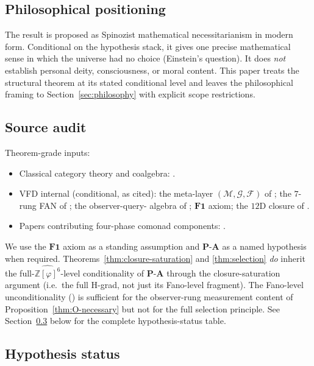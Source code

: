 \documentclass[11pt, a4paper]{amsart}
\theoremstyle{definition}
\newcommand{\Z}{\mathbb{Z}}
\newcommand{\Fcal}{\mathcal{F}}
\newcommand{\Mcal}{\mathcal{M}}
\newcommand{\Gcal}{\mathcal{G}}
\begin{document}
\subsection{Philosophical positioning}

The result is proposed as Spinozist mathematical necessitarianism
in modern form. Conditional on the hypothesis stack, it gives
one precise mathematical sense in which the universe had no
choice (Einstein's question). It does \emph{not} establish
personal deity, consciousness, or moral content. This paper
treats the structural theorem at its stated conditional level
and leaves the philosophical framing to
Section~\ref{sec:philosophy} with explicit scope restrictions.

\subsection{Source audit}

Theorem-grade inputs:
\begin{itemize}
\item Classical category theory and coalgebra:
  \cite{Aczel1988, Rutten2000, Adamek1974, Jacobs2017, TuriPlotkin1997}.
\item VFD internal (conditional, as cited): the meta-layer
  $(\Mcal, \Gcal, \Fcal)$ of \cite{CascadeMetaLayer}; the $7$-rung
  FAN of \cite{CascadeCompletenessAudit}; the observer-query-
  algebra of \cite{CascadeObserverQueryAlgebra}; $\mathbf{F1}$
  axiom; the $12$D closure of \cite{Cascade12D}.
\item Papers contributing four-phase comonad components:
  \cite{PaperXXI, PaperXXXI, PaperXXXIII, PaperXLIV,
  VFDCrystallisation, ACT-L1}.
\end{itemize}

We use the $\mathbf{F1}$ axiom as a standing assumption and
$\mathbf{P\text{-}A}$ as a named hypothesis when required.
Theorems~\ref{thm:closure-saturation} and \ref{thm:selection}
\emph{do} inherit the full-$\widehat{\Z[\varphi]^6}$-level
conditionality of $\mathbf{P\text{-}A}$ through the
closure-saturation argument (i.e.\ the full H-grad, not just
its Fano-level fragment). The Fano-level unconditionality
(\cite{CascadeFanoLift}) is sufficient for the observer-rung
measurement content of Proposition~\ref{thm:O-necessary} but
not for the full selection principle. See
Section~\ref{subsec:hyp-status} below for the complete
hypothesis-status table.

\subsection{Hypothesis status}
\label{subsec:hyp-status}
\end{document}
